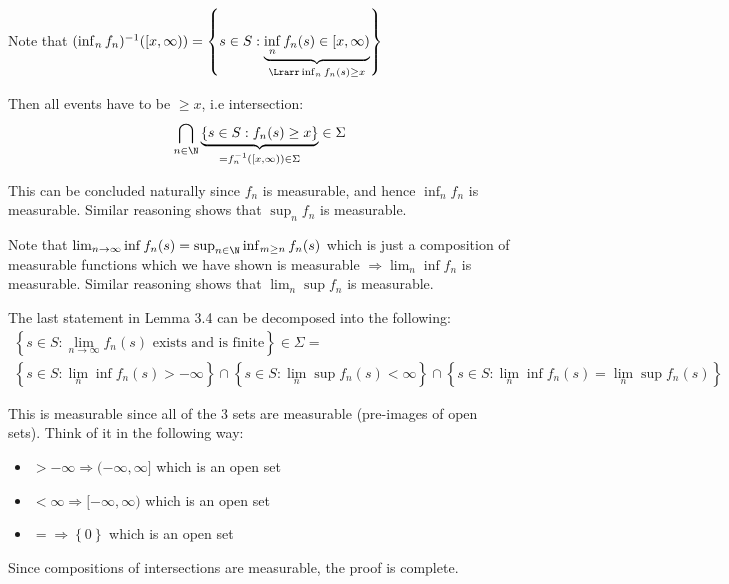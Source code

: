 \begin{prf}[]{}
  Note that $(\inf_n f_n)^{-1}([x,\infty)) = \left\{s\in S:\underbrace{\inf_n f_n(s)\in[x,\infty)}_{\Lrarr \inf_n f_n(s)\geq x}\right\}$
  \par\bigskip
  \noindent Then all events have to be $\geq x$, i.e intersection: 
  \begin{equation*}
    \begin{gathered}
      \bigcap_{n\in\N}\underbrace{\left\{s\in S:f_n(s)\geq x\right\}}_{=f_n^{-1}([x,\infty))\in\Sigma}\in \Sigma
    \end{gathered}
  \end{equation*}\par
  \noindent This can be concluded naturally since $f_n$ is measurable, and hence $\inf_n f_n$ is measurable. Similar reasoning shows that $\sup_n f_n$ is measurable.
  \par\bigskip
  \noindent Note that $\lim_{n\to\infty}\inf f_n(s) = \sup_{n\in\N}\inf_{m\geq n}f_n(s)$ which is just a composition of measurable functions which we have shown is measurable $\Rightarrow \lim_{n}\inf f_n$ is measurable. Similar reasoning shows that $\lim_{n}\sup f_n$ is measurable.
  \par\bigskip
  \noindent The last statement in Lemma 3.4 can be decomposed into the following:
  \begin{equation*}
    \begin{gathered}
      \left\{s\in S:\lim_{n\to\infty}f_n(s)\text{ exists and is finite}\right\}\in\Sigma=\\
     \left\{s\in S:\lim_{n}\inf f_n(s)>-\infty\right\}\cap \left\{s\in S:\lim_{n}\sup f_n(s)<\infty\right\}\cap\left\{s\in S: \lim_{n}\inf f_n(s) = \lim_{n}\sup f_n(s)\right\}
    \end{gathered}
  \end{equation*}
  \par\bigskip
  \noindent This is measurable since all of the 3 sets are measurable (pre-images of open sets). Think of it in the following way:\par
  \begin{itemize}
    \item $>-\infty\Rightarrow (-\infty,\infty]$ which is an open set
    \item $<\infty\Rightarrow [-\infty,\infty)$ which is an open set
  \item $= \Rightarrow \left\{0\right\}$ which is an open set
  \end{itemize}
  \par\bigskip
  \noindent Since compositions of intersections are measurable, the proof is complete.
\end{prf}

